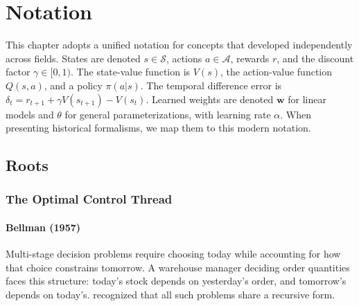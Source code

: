 
\section*{Notation}

This chapter adopts a unified notation for concepts that developed independently across fields. States are denoted $s \in \mathcal{S}$, actions $a \in \mathcal{A}$, rewards $r$, and the discount factor $\gamma \in [0,1)$. The state-value function is $V(s)$, the action-value function $Q(s,a)$, and a policy $\pi(a|s)$. The temporal difference error is $\delta_t = r_{t+1} + \gamma V(s_{t+1}) - V(s_t)$. Learned weights are denoted $\mathbf{w}$ for linear models and $\theta$ for general parameterizations, with learning rate $\alpha$. When presenting historical formalisms, we map them to this modern notation.

\subsection{Roots}

\subsubsection{The Optimal Control Thread}

\paragraph{Bellman (1957)}

Multi-stage decision problems require choosing today while accounting for how that choice constrains tomorrow. A warehouse manager deciding order quantities faces this structure: today's stock depends on yesterday's order, and tomorrow's depends on today's. \citet{Bellman1957} recognized that all such problems share a recursive form.

